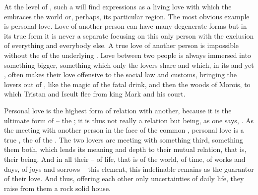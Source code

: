 \pa\label{pa:persloveB} \mine At the level of , such a 
will find {expressions} as a living love with which the  embraces the
world or, perhaps, its particular region.  The most obvious example is personal
love. Love of another
person can have many degenerate forms but in its true form it is never a
separate focusing on this only person with the exclusion of everything and
everybody else. A true love of another person is impossible without the
 of the underlying . Love between two people is always
immersed into something bigger, something which only the lovers share and which,
in its  and yet , often makes their love offensive
to the social law and customs, bringing the lovers out of , like
the magic of the fatal drink, and then the woods of Morois, to which Tristan and
Iseult flee from king Mark and his court.


Personal love is the highest form of relation with another, because it is the
ultimate form of  --  the ; it is thus not
really a relation but being, as one says, .  As the meeting
with another person in the face of the common , personal love is a
true , the  of  the .  The
two lovers are meeting with something third, something  them both,
which lends its meaning and depth to their mutual relation, that is, their
being. And in all their  -- of life, that is of the world, of time,
of works and days, of joys and sorrows -- this  element, this
indefinable  remains  as the  guarantor
of their  love.  And thus, offering each other only 
uncertainties of daily life, they raise from them a rock solid house.

